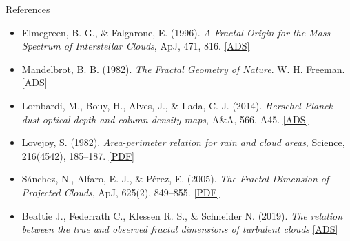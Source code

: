 \documentclass[hyperref={pdfpagelabels=false}, aspectratio=169, t]{beamer}  %
\begin{document}
\begin{textFrame}{References}{}{}

\vspace{-0.5em}
\begin{itemize}
    \item Elmegreen, B. G., \& Falgarone, E. (1996). \textit{A Fractal Origin for the Mass Spectrum of Interstellar Clouds}, ApJ, 471, 816. \href{https://ui.adsabs.harvard.edu/abs/1996ApJ...471..816E/abstract}{[ADS]}
    
    \item Mandelbrot, B. B. (1982). \textit{The Fractal Geometry of Nature}. W. H. Freeman. \href{https://ui.adsabs.harvard.edu/abs/1982mfmb.book.....M/abstract}{[ADS]}
    
    \item Lombardi, M., Bouy, H., Alves, J., \& Lada, C. J. (2014). \textit{Herschel-Planck dust optical depth and column density maps}, A\&A, 566, A45. \href{https://ui.adsabs.harvard.edu/abs/2014A&A...566A..45L/abstract}{[ADS]}
    
    \item Lovejoy, S. (1982). \textit{Area-perimeter relation for rain and cloud areas}, Science, 216(4542), 185–187. \href{https://www.physics.mcgill.ca/~gang/eprints/eprintLovejoy/neweprint/Lovejoy.Science.1982.pdf}{[PDF]}
    
    \item Sánchez, N., Alfaro, E. J., \& Pérez, E. (2005). \textit{The Fractal Dimension of Projected Clouds}, ApJ, 625(2), 849–855. \href{https://iopscience.iop.org/article/10.1086/429553/pdf}{[PDF]}
    
	\item Beattie J., Federrath C., Klessen R. S., \& Schneider N. (2019). \textit{The relation between the true and observed fractal dimensions of turbulent clouds} \href{https://ui.adsabs.harvard.edu/abs/2019MNRAS.488.2493B/abstract}{[ADS]}
\end{itemize}

\end{textFrame}



	
\end{document}

